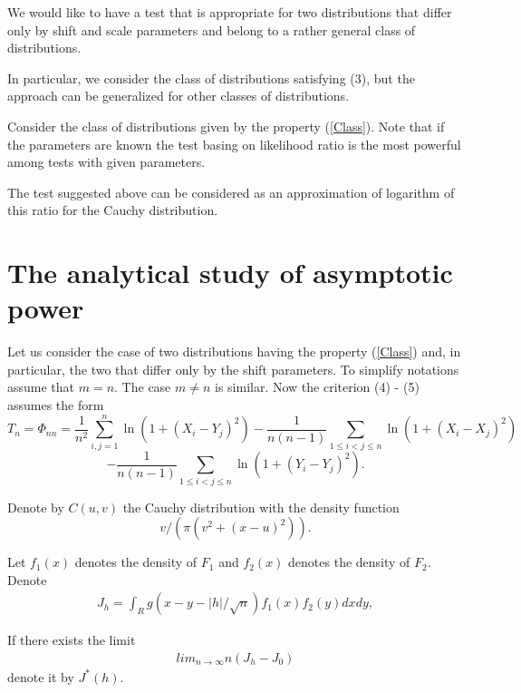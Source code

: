 \documentclass{svproc}
\begin{document}
We would like to have a test that is appropriate for two distributions that differ only by shift and scale parameters and belong to a rather general class of distributions.


In particular, we consider the class of distributions satisfying (3), but the approach can be generalized for other classes of distributions.

Consider the class of distributions given by the property (\ref{Class}). Note that if the parameters are known the test basing on likelihood ratio is the most powerful among tests with given parameters.


The test suggested above can be considered as an approximation of logarithm of this ratio for the Cauchy distribution.





\section{The analytical study of asymptotic power}
\label{S:2}

Let us consider the case of two distributions having the property (\ref{Class}) and, in particular, the two that differ only by the shift parameters. To simplify notations assume that $m=n$. The case $m\ne n$ is similar.
Now the criterion  (4) - (5)  assumes the form
\begin{equation}
T_n=\Phi_{nn}= \frac{1}{n^2}\sum_{i,j=1}^n \ln(1 + (X_i - Y_j)^2)-\frac{1}{n(n-1)}\sum_{1\leq i<j\leq n}  \ln(1 + (X_i - X_j)^2)
\end{equation}
\begin{equation}
-  \frac{1}{n(n-1)}\sum_{1\leq i<j\leq n}  \ln(1 + (Y_i - Y_j)^2).
\end{equation}

Denote by $C(u,v)$ the Cauchy distribution with the density function
$$
v/(\pi(v^2 + (x-u)^2)).
$$

 Let $f_1(x)$ denotes the density of $F_1$ and $f_2(x)$ denotes the density of $F_2$.
Denote
\begin{eqnarray*}
J_h =\int_R g(x-y-|h|/\sqrt{n})f_1(x)f_2(y)dxdy,
\end{eqnarray*}

If there exists the limit
\begin{eqnarray}
lim_{n\to \infty} n(J_h - J_0)
\end{eqnarray}
denote it by $J^*(h)$.
\end{document}
